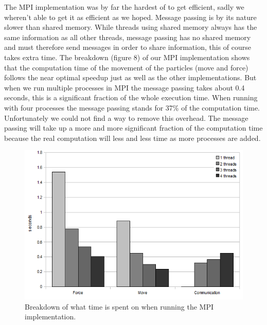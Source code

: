 The MPI implementation was by far the hardest of to get efficient, sadly we
wheren't able to get it as efficient as we hoped. Message passing is by its
nature slower than shared memory. While threads using shared memory always has
the same information as all other threads, message passing has no shared memory
and must therefore send messages in order to share information, this of course
takes extra time. The breakdown (figure 8) of our MPI implementation shows that
the computation time of the movement of the particles (move and force) follows
the near optimal speedup just as well as the other implementations. But when we
run multiple processes in MPI the message passing takes about 0.4 seconds, this
is a significant fraction of the whole execution time. When running with four
processes the message passing stands for 37\% of the computation time.
Unfortunately we could not find a way to remove this overhead. The message
passing will take up a more and more significant fraction of the computation
time because the real computation will less and less time as more processes are
added.

\begin{figure}[H]
    \label{breakdown}
	\includegraphics[width=\textwidth]{mpilol}
	\caption{Breakdown of what time is spent on when running the MPI
    implementation.}
\end{figure}
